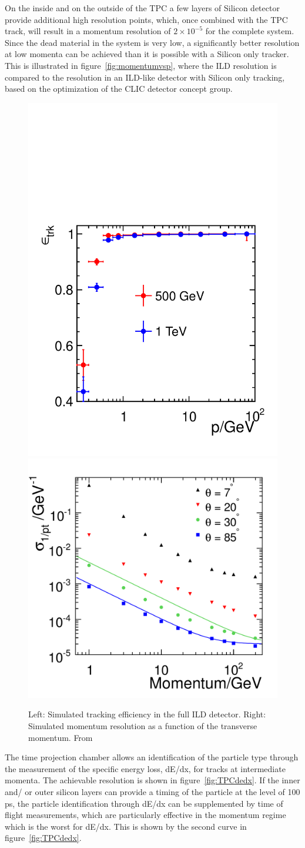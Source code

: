 \documentclass[%
 amsmath,amssymb,
 aps,
]{revtex4-1}
\begin{document}
On the inside and on the outside of the TPC a few layers of Silicon detector provide additional high resolution points, which, once combined with the TPC track, will result in a momentum resolution of $2 \times 10^{-5}$ for the complete system. Since the dead material in the system is very low, a significantly better resolution at low momenta can be achieved than it is possible with a Silicon only tracker. This is illustrated in figure~\ref{fig:momentumvsp}, where the ILD resolution is compared to the resolution in an ILD-like detector with Silicon only tracking, based on the optimization of the CLIC detector concept group. 

\begin{figure}
    \centering
    \includegraphics[width=0.384\hsize]{figures/FullTrackPerformance_Effy_P.pdf}
    \includegraphics[width=0.4\hsize]{figures/deltaInvP_all_fits.pdf}
    \caption{Left: Simulated tracking efficiency in the full ILD detector. Right: Simulated momentum resolution as a function of the transverse momentum. From \cite{ILD-DBD}}
    \label{fig:my_label}
\end{figure}

The time projection chamber allows an identification of the particle type through the measurement of the specific energy loss, dE/dx, for tracks at intermediate momenta. The achievable resolution is shown in figure~\ref{fig:TPCdedx}. If the inner and/ or outer silicon layers can provide a timing of the particle at the level of 100 ps, the particle identification through dE/dx can be supplemented by time of flight measurements, which are particularly effective in the momentum regime which is the worst for dE/dx. This is shown by the second curve in figure~\ref{fig:TPCdedx}. 
\end{document}
